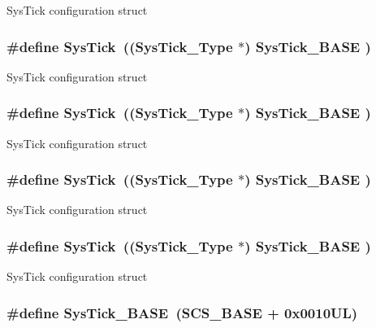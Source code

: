 Sys\-Tick configuration struct \hypertarget{group___c_m_s_i_s__core__base_gacd96c53beeaff8f603fcda425eb295de}{
\subsubsection[{Sys\-Tick}]{\setlength{\rightskip}{0pt plus 5cm}\#define Sys\-Tick~(({\bf Sys\-Tick\-\_\-\-Type}   $\ast$)     {\bf Sys\-Tick\-\_\-\-B\-A\-S\-E}  )}}\label{group___c_m_s_i_s__core__base_gacd96c53beeaff8f603fcda425eb295de}
Sys\-Tick configuration struct \hypertarget{group___c_m_s_i_s__core__base_gacd96c53beeaff8f603fcda425eb295de}{
\subsubsection[{Sys\-Tick}]{\setlength{\rightskip}{0pt plus 5cm}\#define Sys\-Tick~(({\bf Sys\-Tick\-\_\-\-Type}   $\ast$)     {\bf Sys\-Tick\-\_\-\-B\-A\-S\-E}  )}}\label{group___c_m_s_i_s__core__base_gacd96c53beeaff8f603fcda425eb295de}
Sys\-Tick configuration struct \hypertarget{group___c_m_s_i_s__core__base_gacd96c53beeaff8f603fcda425eb295de}{
\subsubsection[{Sys\-Tick}]{\setlength{\rightskip}{0pt plus 5cm}\#define Sys\-Tick~(({\bf Sys\-Tick\-\_\-\-Type}   $\ast$)     {\bf Sys\-Tick\-\_\-\-B\-A\-S\-E}  )}}\label{group___c_m_s_i_s__core__base_gacd96c53beeaff8f603fcda425eb295de}
Sys\-Tick configuration struct \hypertarget{group___c_m_s_i_s__core__base_gacd96c53beeaff8f603fcda425eb295de}{
\subsubsection[{Sys\-Tick}]{\setlength{\rightskip}{0pt plus 5cm}\#define Sys\-Tick~(({\bf Sys\-Tick\-\_\-\-Type}   $\ast$)     {\bf Sys\-Tick\-\_\-\-B\-A\-S\-E}  )}}\label{group___c_m_s_i_s__core__base_gacd96c53beeaff8f603fcda425eb295de}
Sys\-Tick configuration struct \hypertarget{group___c_m_s_i_s__core__base_ga58effaac0b93006b756d33209e814646}{
\subsubsection[{Sys\-Tick\-\_\-\-B\-A\-S\-E}]{\setlength{\rightskip}{0pt plus 5cm}\#define Sys\-Tick\-\_\-\-B\-A\-S\-E~({\bf S\-C\-S\-\_\-\-B\-A\-S\-E} +  0x0010\-U\-L)}}\label{group___c_m_s_i_s__core__base_ga58effaac0b93006b756d33209e814646}
